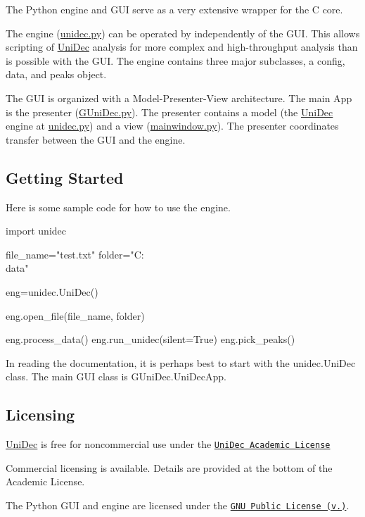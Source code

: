 The Python engine and G\+U\+I serve as a very extensive wrapper for the C core.

The engine (\hyperlink{unidec_8py}{unidec.\+py}) can be operated by independently of the G\+U\+I. This allows scripting of \hyperlink{namespace_uni_dec}{Uni\+Dec} analysis for more complex and high-\/throughput analysis than is possible with the G\+U\+I. The engine contains three major subclasses, a config, data, and peaks object.

The G\+U\+I is organized with a Model-\/\+Presenter-\/\+View architecture. The main App is the presenter (\hyperlink{_g_uni_dec_8py}{G\+Uni\+Dec.\+py}). The presenter contains a model (the \hyperlink{namespace_uni_dec}{Uni\+Dec} engine at \hyperlink{unidec_8py}{unidec.\+py}) and a view (\hyperlink{mainwindow_8py}{mainwindow.\+py}). The presenter coordinates transfer between the G\+U\+I and the engine.

\subsection*{Getting Started}

Here is some sample code for how to use the engine. \begin{DoxyVerb}import unidec

file_name="test.txt"
folder="C:\\data"

eng=unidec.UniDec()

eng.open_file(file_name, folder)

eng.process_data()
eng.run_unidec(silent=True)
eng.pick_peaks()
\end{DoxyVerb}


In reading the documentation, it is perhaps best to start with the unidec.\+Uni\+Dec class. The main G\+U\+I class is G\+Uni\+Dec.\+Uni\+Dec\+App.

\subsection*{Licensing}

\hyperlink{namespace_uni_dec}{Uni\+Dec} is free for noncommercial use under the \href{http://unidec.chem.ox.ac.uk/12116_UniDec_Academic%20Use%20Licence.pdf}{\tt Uni\+Dec Academic License}

Commercial licensing is available. Details are provided at the bottom of the Academic License.

The Python G\+U\+I and engine are licensed under the \href{http://www.gnu.org/licenses/gpl-3.0.en.html}{\tt G\+N\+U Public License (v.)}. 
